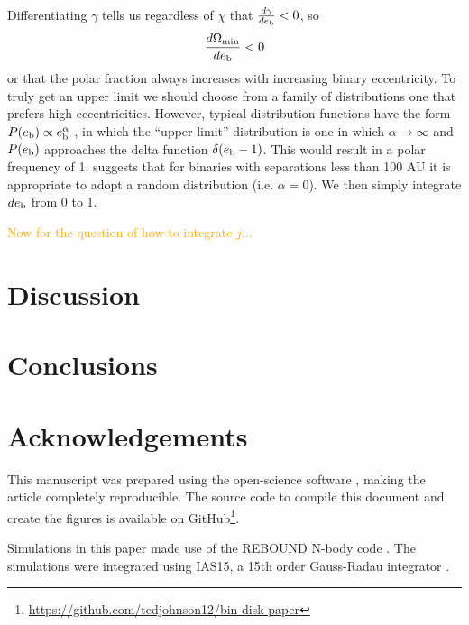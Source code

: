\documentclass[twocolumn]{aastex631}
\newcommand\ghurl[0]{\url{https://github.com/tedjohnson12/bin-disk-paper}}
\newcommand{\TJ}[1]{\textcolor{orange}{#1}}
\begin{document}
Differentiating $\gamma$ tells us regardless of $\chi$ that $\frac{d\gamma}{de_{\rm b}} < 0$, so
\begin{equation}
    \frac{d\Omega_{\rm min}}{de_{\rm b}} < 0
\end{equation}
or that the polar fraction always increases with increasing binary eccentricity.
To truly get an upper limit we should choose from a family of distributions one that prefers high eccentricities. However, typical distribution
functions have the form $P(e_{\rm b}) \propto e_{\rm b}^\alpha$ \citep[e.g.][]{hwang2022,ceppi2024}, in which the ``upper limit'' distribution
is one in which $\alpha \rightarrow \infty$ and $P(e_{\rm b})$ approaches the delta function $\delta(e_{\rm b} - 1)$. This would result in a polar frequency
of 1. \citet{hwang2022} suggests that for binaries with separations less than 100 AU it is appropriate to adopt a random distribution (i.e. $\alpha=0$). We then simply
integrate $de_{\rm b}$ from 0 to 1.

\TJ{Now for the question of how to integrate $j$...}

\section{Discussion}
\label{sec:discussion}

\section{Conclusions}
\label{sec:conclusions}





\section{Acknowledgements}
\label{sec:ack}

This manuscript was prepared using the open-science software \href{https://show-your.work/en/latest/intro/}{\showyourwork} \citep{luger2021}, making the article completely
reproducible. The source code to compile this document and create the figures is available on GitHub\footnote{\ghurl}.

Simulations in this paper made use of the REBOUND N-body code \citep{rebound}.
The simulations were integrated using IAS15, a 15th order Gauss-Radau integrator \citep{reboundias15}. 



\end{document}
